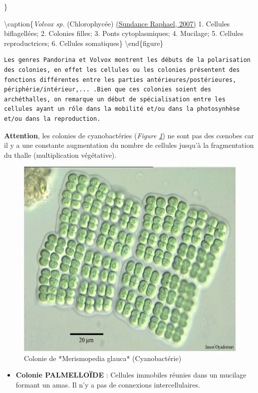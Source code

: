\documentclass[
]{book}
\providecommand{\tightlist}{%
  \setlength{\itemsep}{0pt}\setlength{\parskip}{0pt}}
\begin{document}
\}

\textbackslash caption\{\emph{Volvox sp.} (Chlorophycée) \href{http://commons.wikimedia.org/wiki/User:Sundance_Raphael}{(Sundance Raphael, 2007)} 1. Cellules biflagellées; 2. Colonies filles; 3. Ponts cytoplasmiques; 4. Mucilage; 5. Cellules reproductrices; 6. Cellules somatiques\}\label{fig:volvox}
\textbackslash end\{figure\}

\begin{verbatim}
Les genres Pandorina et Volvox montrent les débuts de la polarisation des colonies, en effet les cellules ou les colonies présentent des fonctions différentes entre les parties antérieures/postérieures, périphérie/intérieur,... .Bien que ces colonies soient des archéthalles, on remarque un début de spécialisation entre les cellules ayant un rôle dans la mobilité et/ou dans la photosynhèse et/ou dans la reproduction.
\end{verbatim}

\textbf{Attention}, les colonies de cyanobactéries (\emph{Figure \ref{fig:merismopedia}}) ne sont pas des cœnobes car il y a une constante augmentation du nombre de cellules jusqu'à la fragmentation du thalle (multiplication végétative).

\begin{figure}[H]

{\centering \includegraphics[width=0.7\linewidth]{./images/merismopedia} 

}

\caption{Colonie de *Merismopedia glauca* (Cyanobactérie)}\label{fig:merismopedia}
\end{figure}

\begin{itemize}
\tightlist
\item
  \textbf{Colonie PALMELLOÏDE} : Cellules immobiles réunies dans un mucilage formant un amas. Il n'y a pas de connexions intercellulaires.
\end{itemize}
\end{document}

